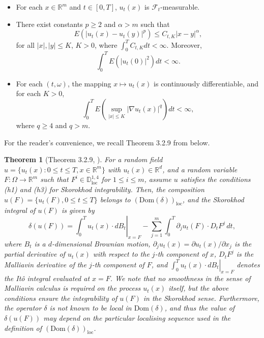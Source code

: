 \documentclass[]{interact}
\newcommand{\1}{\mathbf{1}}
\theoremstyle{plain}%
\newtheorem{theorem}{Theorem}[section]
\theoremstyle{definition}
\theoremstyle{remark}
\numberwithin{equation}{section}
\begin{document}
\begin{itemize}
    \item[(h1)] For each \( x \in \mathbb{R}^m \) and \( t \in [0,T] \), \( u_t(x) \) is \( \mathcal{F}_t \)-measurable.
    
    \item[(h2)] There exist constants \( p \geq 2 \) and \( \alpha > m \) such that
    \[
    E(|u_t(x) - u_t(y)|^p) \leq C_{t,K} |x - y|^{\alpha},
    \]
    for all \( |x|, |y| \leq K \), \( K > 0 \), where \( \int_0^T C_{t,K} dt < \infty \). Moreover,
    \[
    \int_0^T E(|u_t(0)|^2) dt < \infty.
    \]
    \item[(h3)] For each \( (t, \omega) \), the mapping \( x \mapsto u_t(x) \) is continuously differentiable, and for each \( K > 0 \),
    \[
    \int_0^T E \left( \sup_{|x| \leq K} |\nabla u_t(x)|^q \right) dt < \infty,
    \]
    where \( q \geq 4 \) and \( q > m \).
\end{itemize}

For the reader’s convenience, we recall Theorem 3.2.9 from \cite{nualart2006malliavin} below.

\begin{theorem}[Theorem 3.2.9, \cite{nualart2006malliavin}]
\label{thm:nualart}
For a random field \( u = \{ u_t(x) : 0 \leq t \leq T, x \in \mathbb{R}^m \} \) with \( u_t(x) \in \mathbb{R}^d \), and a random variable \( F: \Omega \to \mathbb{R}^m \) such that \( F^i \in \mathbb{D}^{1,4}_{\text{loc}} \) for \( 1 \leq i \leq m \), assume \( u \) satisfies the conditions (h1) and (h3) for Skorokhod integrability.
%
Then, the composition \( u(F) = \{ u_t(F), 0 \leq t \leq T \} \) belongs to \( (\text{Dom} (\delta))_{\text{loc}} \), and the Skorokhod integral of \( u(F) \) is given by
\[
\delta(u(F)) = \left. \int_0^T u_t(x) \cdot dB_t \right|_{x=F} - \sum_{j=1}^m \int_0^T \partial_j u_t(F) \cdot D_t F^j \, dt,
\]
where \( B_t \) is a \( d \)-dimensional Brownian motion, \( \partial_j u_t(x) = \partial u_t(x)/\partial x_j  \) is the partial derivative of \( u_t(x) \) with respect to the \( j \)-th component of \( x \), \( D_t F^j \) is the Malliavin derivative of the \( j \)-th component of \( F \), and \( \left. \int_0^T u_t(x) \cdot dB_t \right|_{x=F} \) denotes the It\^o integral evaluated at \( x = F \).
We note that no smoothness in the sense of Malliavin calculus is required on the process \( u_t(x) \) itself, but the above conditions ensure the integrability of \( u(F) \) in the Skorokhod sense. Furthermore, the operator \( \delta \) is not known to be local in \( \text{Dom} (\delta) \), and thus the value of \( \delta(u(F)) \) may depend on the particular localising sequence used in the definition of \( (\text{Dom}( \delta))_{\text{loc}} \).
\end{theorem}
\end{document}
